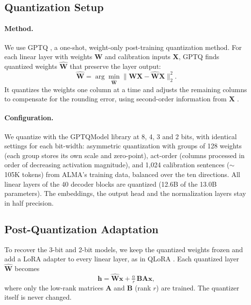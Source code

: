 \documentclass[10pt]{article}
\begin{document}
\subsection{Quantization Setup}
\paragraph{Method.} We use GPTQ \citep{frantar2023gptq}, a one-shot, weight-only
post-training quantization method. For each linear layer with weights
$\mathbf{W}$ and calibration inputs $\mathbf{X}$, GPTQ finds quantized weights
$\widehat{\mathbf{W}}$ that preserve the layer output:
\begin{equation}
  \widehat{\mathbf{W}} = \arg\min_{\widehat{\mathbf{W}}}
  \big\lVert \mathbf{W}\mathbf{X} - \widehat{\mathbf{W}}\mathbf{X} \big\rVert_2^2 .
\end{equation}
It quantizes the weights one column at a time and adjusts the remaining columns
to compensate for the rounding error, using second-order information from
$\mathbf{X}$ \citep{frantar2022obc}.

\paragraph{Configuration.} We quantize with the GPTQModel library
\citep{gptqmodel} at 8, 4, 3 and 2 bits, with identical settings for each
bit-width: asymmetric quantization with groups of 128 weights (each group stores
its own scale and zero-point), act-order (columns processed in order of
decreasing activation magnitude), and 1{,}024 calibration sentences
($\sim$105K tokens) from ALMA's training data, balanced over the ten directions.
All linear layers of the 40 decoder blocks are quantized (12.6B of the 13.0B
parameters). The embeddings, the output head and the normalization layers stay
in half precision.



\subsection{Post-Quantization Adaptation}
To recover the 3-bit and 2-bit models, we keep the quantized weights frozen and
add a LoRA adapter \citep{hu2022lora} to every linear layer, as in QLoRA
\citep{dettmers2023qlora}. Each quantized layer $\widehat{\mathbf{W}}$ becomes
\begin{equation}
  \mathbf{h} = \widehat{\mathbf{W}}\mathbf{x} + \tfrac{\alpha}{r}\,\mathbf{B}\mathbf{A}\mathbf{x},
\end{equation}
where only the low-rank matrices $\mathbf{A}$ and $\mathbf{B}$ (rank $r$) are
trained. The quantizer itself is never changed.
\end{document}
